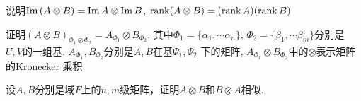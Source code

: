 \begin{remark}
    说明$\mathrm{Im}\, (A\otimes B) = \mathrm{Im}\, A \otimes \mathrm{Im}\, B$,
        $\rank (A\otimes B) = (\rank A)(\rank B)$
\end{remark}
\vspace{5cm}

\begin{remark}
    证明$(A\otimes B)_{\Phi_1 \otimes \Phi_2} = A_{\Phi_1} \otimes B_{\Phi_2}$,
    其中$\Phi_1 = \{\alpha_1, \cdots \alpha_n\}$,
    $\Phi_2 = \{\beta_1, \cdots \beta_m\}$分别是
    $U,V$的一组基. $A_{\Phi_1}, B_{\Phi_2}$分别是$A,B$在基$\Psi_1,\Psi_2$
    下的矩阵, $A_{\Phi_1} \otimes B_{\Phi_2}$中的$\otimes$表示矩阵的Kronecker
    乘积.
\end{remark}
\vspace{6cm}

\begin{remark}
    设$A,B$分别是域$F$上的$n,m$级矩阵，证明$A\otimes B$和$B\otimes A$相似.
\end{remark}